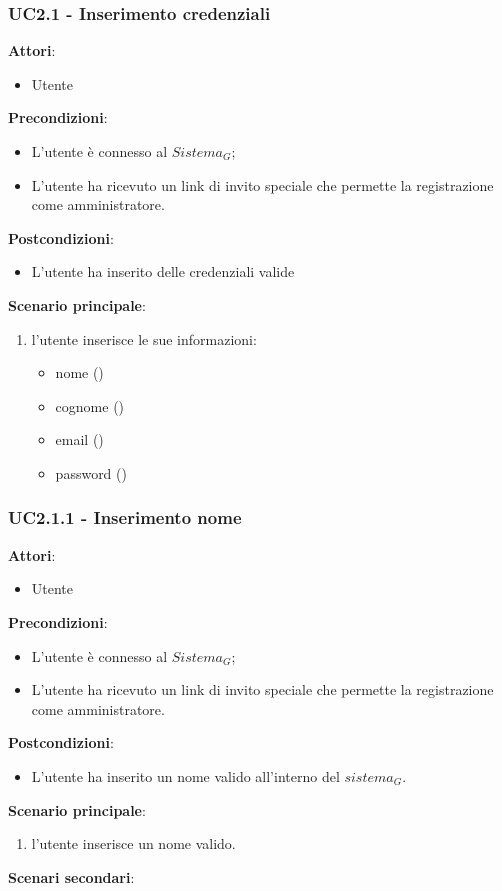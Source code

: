 \subsubsection{UC2.1 - Inserimento credenziali}\label{usecase:2_1}
\textbf{Attori}:
\begin{itemize}
    \item Utente
\end{itemize}
\textbf{Precondizioni}:
\begin{itemize}
     \item L'utente è connesso al $\textit{Sistema}_G$;
    \item L'utente ha ricevuto un link di invito speciale che permette la registrazione come amministratore.
\end{itemize}
\textbf{Postcondizioni}:
\begin{itemize}
    \item L'utente ha inserito delle credenziali valide
\end{itemize}
\textbf{Scenario principale}:
\begin{enumerate}
    \item l'utente inserisce le sue informazioni:
    \begin{itemize}
        \item nome ()
        \item cognome ()
        \item email ()
        \item password ()
    \end{itemize}
\end{enumerate}

\subsubsection{UC2.1.1 - Inserimento nome}\label{usecase:2_1_1}
\textbf{Attori}:
\begin{itemize}
    \item Utente
\end{itemize}
\textbf{Precondizioni}:
\begin{itemize}
   \item L'utente è connesso al $\textit{Sistema}_G$;
    \item L'utente ha ricevuto un link di invito speciale che permette la registrazione come amministratore.
\end{itemize}
\textbf{Postcondizioni}:
\begin{itemize}
    \item L'utente ha inserito un nome valido all'interno del $\textit{sistema}_G$.
\end{itemize}
\textbf{Scenario principale}:
\begin{enumerate}
    \item l'utente inserisce un nome valido.
\end{enumerate}
\textbf{Scenari secondari}:

